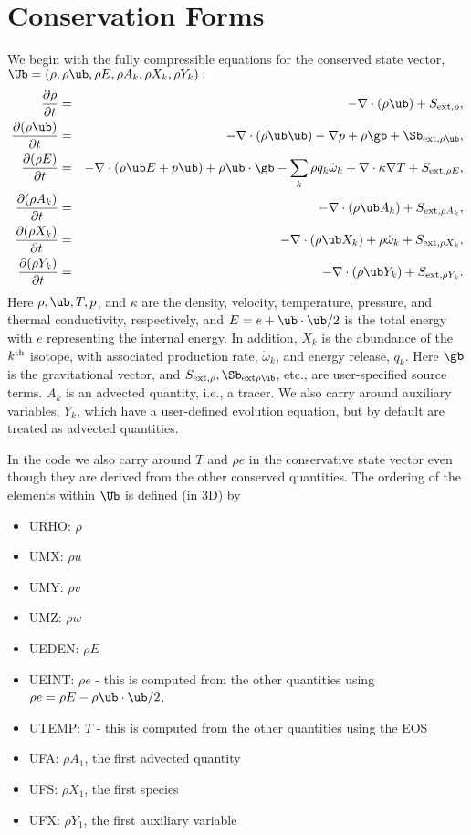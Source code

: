 \section{Conservation Forms}
We begin with the fully compressible equations for the conserved state vector, 
$\Ub = (\rho, \rho \ub, \rho E, \rho A_k, \rho X_k, \rho Y_k):$
\begin{eqnarray}
\frac{\partial \rho}{\partial t} &=& - \nabla \cdot (\rho \ub) + S_{{\rm ext},\rho}, \\
\frac{\partial (\rho \ub)}{\partial t} &=& - \nabla \cdot (\rho \ub \ub) - \nabla p +\rho \gb + \Sb_{{\rm ext},\rho\ub}, \\
\frac{\partial (\rho E)}{\partial t} &=& - \nabla \cdot (\rho \ub E + p \ub) + \rho \ub \cdot \gb - \sum_k {\rho q_k \dot\omega_k} + \nabla\cdot\kappa\nabla T + S_{{\rm ext},\rho E}, \\
\frac{\partial (\rho A_k)}{\partial t} &=& - \nabla \cdot (\rho \ub A_k) + S_{{\rm ext},\rho A_k}, \\
\frac{\partial (\rho X_k)}{\partial t} &=& - \nabla \cdot (\rho \ub X_k) + \rho \dot\omega_k + S_{{\rm ext},\rho X_k}, \\
\frac{\partial (\rho Y_k)}{\partial t} &=& - \nabla \cdot (\rho \ub Y_k) + S_{{\rm ext},\rho Y_k}.
\end{eqnarray}
Here $\rho, \ub, T, p$, and $\kappa$ are the density, velocity,
temperature, pressure, and thermal conductivity, respectively, and 
$E = e + \ub \cdot \ub / 2$ is the total energy with $e$ representing the internal
energy.  In addition, $X_k$ is the abundance of the $k^{\rm th}$ isotope,
with associated production rate, $\dot\omega_k$, and
energy release, $q_k$.  Here $\gb$ is the gravitational vector,
and $S_{{\rm ext},\rho}, \Sb_{{\rm ext}\rho\ub}$, etc.,
are user-specified source terms.  $A_k$ is an advected quantity, i.e., 
a tracer.  We also carry around auxiliary variables, $Y_k$, which have a 
user-defined evolution equation, but by default are treated as advected
quantities.

In the code we also carry around $T$ and $\rho e$ in the conservative state vector
even though they are derived from the other conserved quantities.
The ordering of the elements within $\Ub$ is defined (in 3D) by
\begin{itemize}
\item URHO: $\rho$
\item UMX: $\rho u$
\item UMY: $\rho v$
\item UMZ: $\rho w$
\item UEDEN: $\rho E$
\item UEINT: $\rho e$ - this is computed from the other quantities using
             $\rho e = \rho E - \rho \ub \cdot \ub / 2$.
\item UTEMP: $T$ - this is computed from the other quantities using the EOS
\item UFA: $\rho A_1$, the first advected quantity
\item UFS: $\rho X_1$, the first species
\item UFX: $\rho Y_1$, the first auxiliary variable
\end{itemize}

